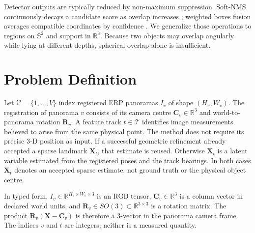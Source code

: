 \documentclass[a4paper,9pt]{extarticle}
\newcommand{\sphere}{\mathbb S^2}
\newcommand{\R}{\mathbb R}
\begin{document}
Detector outputs are typically reduced by non-maximum suppression. Soft-NMS continuously decays a candidate score as overlap increases \citep{bodla2017softnms}; weighted boxes fusion averages compatible coordinates by confidence \citep{solovyev2021wbf}. We generalize those operations to regions on $\sphere$ and support in $\R^3$. Because two objects may overlap angularly while lying at different depths, spherical overlap alone is insufficient.

\section{Problem Definition}

Let $\mathcal V=\{1,\ldots,V\}$ index registered ERP panoramas $I_v$ of shape $(H_v,W_v)$. The registration of panorama $v$ consists of its camera centre $\mathbf C_v\in\R^3$ and world-to-panorama rotation $\mathbf R_v$. A feature track $t\in\mathcal T$ identifies image measurements believed to arise from the same physical point. The method does not require its precise 3-D position as input. If a successful geometric refinement already accepted a sparse landmark $\mathbf X_t$, that estimate is reused. Otherwise $\mathbf X_t$ is a latent variable estimated from the registered poses and the track bearings. In both cases $\mathbf X_t$ denotes an accepted sparse estimate, not ground truth or the physical object centre.

In typed form, $I_v\in\R^{H_v\times W_v\times3}$ is an RGB tensor,
$\mathbf C_v\in\R^3$ is a column vector in declared world units, and
$\mathbf R_v\in SO(3)\subset\R^{3\times3}$ is a rotation matrix. The product
$\mathbf R_v(\mathbf X-\mathbf C_v)$ is therefore a 3-vector in the panorama
camera frame. The indices $v$ and $t$ are integers; neither is a measured
quantity.
\end{document}
